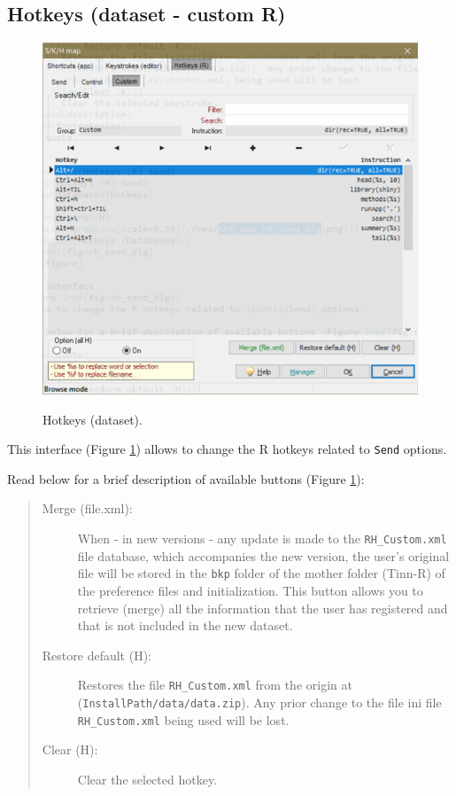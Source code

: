 \subsection{Hotkeys (dataset - custom R)}

\begin{figure}[H]
  \includegraphics[scale=0.8]{./res/dlg_skh_map_rh_custom.png}\\
  \caption{Hotkeys (dataset).}
  \label{fig:rh_custom_dlg}
\end{figure}

This interface
(Figure \ref{fig:rh_custom_dlg})
allows to change the R hotkeys related to \texttt{Send} options.

Read below for a brief description of available buttons (Figure \ref{fig:rh_custom_dlg}):

\begin{quote}
  \begin{footnotesize}
    \begin{description}
      \item[Merge (file.xml):]
        When - in new versions - any update is made to the \texttt{RH\_Custom.xml} file database,
        which accompanies the new version, the user's original file will be stored in
        the \texttt{bkp} folder of the mother folder (Tinn-R) of the preference files and initialization.
        This button allows you to retrieve (merge) all the information that the user has registered
        and that is not included in the new dataset.
      \item[Restore default (H):]
        Restores the file \texttt{RH\_Custom.xml} from the origin at
        (\texttt{InstallPath/data/data.zip}). Any prior change to the file ini file
        \texttt{RH\_Custom.xml} being used will be lost.
      \item[Clear (H):]
        Clear the selected hotkey.
    \end{description}
  \end{footnotesize}
\end{quote}



